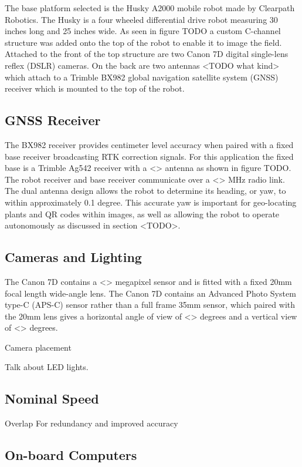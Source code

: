 The base platform selected is the Husky A2000 mobile robot made by Clearpath Robotics.  The Husky is a four wheeled differential drive robot measuring 30 inches long and 25 inches wide.  As seen in figure TODO a custom C-channel structure was added onto the top of the robot to enable it to image the field.  Attached to the front of the top structure are two Canon 7D digital single-lens reflex (DSLR) cameras. On the back are two antennas <TODO what kind> which attach to a Trimble BX982 global navigation satellite system (GNSS) receiver which is mounted to the top of the robot.   

\subsection{GNSS Receiver}

The BX982 receiver provides centimeter level accuracy when paired with a fixed base receiver broadcasting RTK correction signals.  For this application the fixed base is a Trimble Ag542 receiver with a <> antenna as shown in figure TODO.  The robot receiver and base receiver communicate over a <> MHz radio link.   The dual antenna design allows the robot to determine its heading, or yaw, to within approximately 0.1 degree.  This accurate yaw is important for geo-locating plants and QR codes within images, as well as allowing the robot to operate autonomously as discussed in section <TODO>. 

\subsection{Cameras and Lighting}

The Canon 7D contains a <> megapixel sensor and is fitted with a fixed 20mm focal length wide-angle lens.  The Canon 7D contains an Advanced Photo System type-C (APS-C) sensor rather than a full frame 35mm sensor, which paired with the 20mm lens gives a horizontal angle of view of <> degrees and a vertical view of <> degrees.  

Camera placement

Talk about LED lights.  

\subsection{Nominal Speed}

Overlap
For redundancy and improved accuracy

\subsection{On-board Computers}

